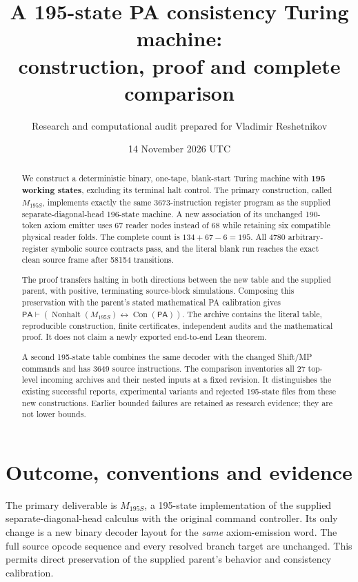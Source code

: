 \documentclass[11pt,a4paper]{article}
\title{A 195-state PA consistency Turing machine:\\construction, proof and complete comparison}
\author{Research and computational audit prepared for Vladimir Reshetnikov}
\date{14 November 2026 UTC}
\newcommand{\PA}{\mathsf{PA}}
\newcommand{\Con}{\operatorname{Con}}
\newcommand{\Nonhalt}{\operatorname{Nonhalt}}
\begin{document}
\maketitle
\begin{abstract}
We construct a deterministic binary, one-tape, blank-start Turing machine
with \textbf{195 working states}, excluding its terminal halt control.
The primary construction, called $M_{195S}$, implements exactly the
same 3673-instruction register program as the supplied separate-diagonal-head
196-state machine. A new association of its unchanged 190-token axiom
emitter uses 67 reader nodes instead of 68 while retaining six compatible
physical reader folds. The complete count is $134+67-6=195$.
All 4780 arbitrary-register symbolic source contracts pass, and the literal
blank run reaches the exact clean source frame after 58154 transitions.

The proof transfers halting in both directions between the new table
and the supplied parent, with positive, terminating source-block
simulations. Composing this preservation with the parent's stated
mathematical PA calibration gives
$\PA\vdash(\Nonhalt(M_{195S})\leftrightarrow\Con(\PA))$.
The archive contains the literal table, reproducible construction,
finite certificates, independent audits and the mathematical proof.
It does not claim a newly exported end-to-end Lean theorem.

A second 195-state table combines the same decoder with the changed
Shift/MP commands and has 3649 source instructions. The comparison
inventories all 27 top-level incoming archives and their nested inputs
at a fixed revision. It distinguishes the existing successful reports,
experimental variants and rejected 195-state files from these new
constructions. Earlier bounded failures are retained as research
evidence; they are not lower bounds.
\end{abstract}
\tableofcontents
\newpage

\section{Outcome, conventions and evidence}
\label{sec:outcome}

The primary deliverable is $M_{195S}$, a 195-state implementation of
the supplied separate-diagonal-head calculus with the original command
controller. Its only change is a new binary decoder layout for the
\emph{same} axiom-emission word. The full source opcode sequence and
every resolved branch target are unchanged. This permits direct
preservation of the supplied parent's behavior and consistency calibration.
\end{document}
